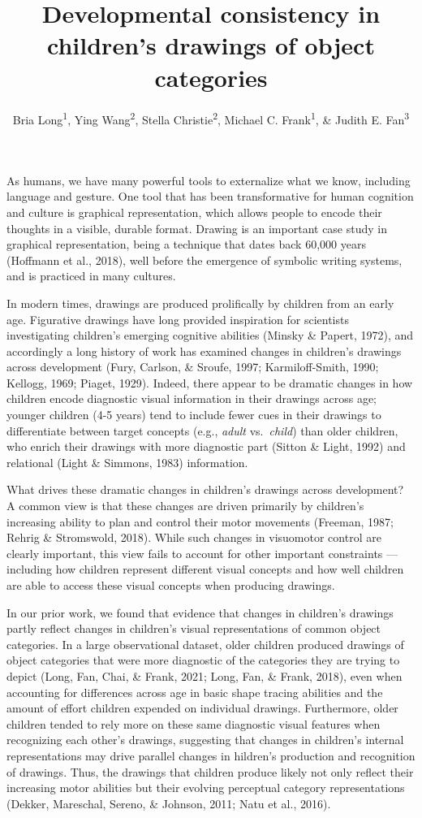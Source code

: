 \documentclass[
  english,
  man]{apa6}
\author{Bria Long\textsuperscript{1}, Ying Wang\textsuperscript{2}, Stella Christie\textsuperscript{2}, Michael C. Frank\textsuperscript{1}, \& Judith E. Fan\textsuperscript{3}}
\affiliation{
\vspace{0.5cm}
\textsuperscript{1} Stanford University\\\textsuperscript{2} Tsinghua University\\\textsuperscript{3} University of California, San Diego}
\title{Developmental consistency in children's drawings of object categories}
\date{}
\begin{document}
\maketitle

As humans, we have many powerful tools to externalize what we know, including language and gesture.
One tool that has been transformative for human cognition and culture is graphical representation, which allows people to encode their thoughts in a visible, durable format.
Drawing is an important case study in graphical representation, being a technique that dates back 60,000 years (Hoffmann et al., 2018), well before the emergence of symbolic writing systems, and is practiced in many cultures.

In modern times, drawings are produced prolifically by children from an early age.
Figurative drawings have long provided inspiration for scientists investigating children's emerging cognitive abilities (Minsky \& Papert, 1972), and accordingly a long history of work has examined changes in children's drawings across development (Fury, Carlson, \& Sroufe, 1997; Karmiloff-Smith, 1990; Kellogg, 1969; Piaget, 1929).
Indeed, there appear to be dramatic changes in how children encode diagnostic visual information in their drawings across age; younger children (4-5 years) tend to include fewer cues in their drawings to differentiate between target concepts (e.g., \textit{adult} vs.~\textit{child}) than older children, who enrich their drawings with more diagnostic part (Sitton \& Light, 1992) and relational (Light \& Simmons, 1983) information.

What drives these dramatic changes in children's drawings across development?
A common view is that these changes are driven primarily by children's increasing ability to plan and control their motor movements (Freeman, 1987; Rehrig \& Stromswold, 2018).
While such changes in visuomotor control are clearly important, this view fails to account for other important constraints --- including how children represent different visual concepts and how well children are able to access these visual concepts when producing drawings.

In our prior work, we found that evidence that changes in children's drawings partly reflect changes in children's visual representations of common object categories. In a large observational dataset, older children produced drawings of object categories that were more diagnostic of the categories they are trying to depict (Long, Fan, Chai, \& Frank, 2021; Long, Fan, \& Frank, 2018), even when accounting for differences across age in basic shape tracing abilities and the amount of effort children expended on individual drawings. Furthermore, older children tended to rely more on these same diagnostic visual features when recognizing each other's drawings, suggesting that changes in children's internal representations may drive parallel changes in hildren's production and recognition of drawings. Thus, the drawings that children produce likely not only reflect their increasing motor abilities but their evolving perceptual category representations (Dekker, Mareschal, Sereno, \& Johnson, 2011; Natu et al., 2016).
\end{document}
